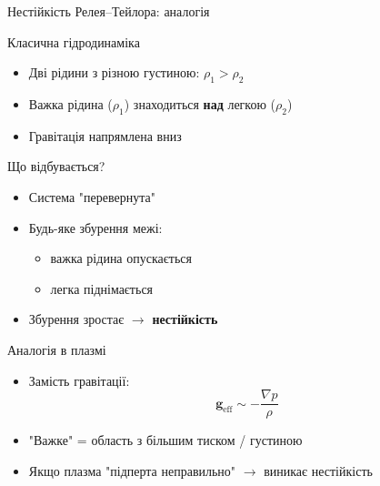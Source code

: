 \documentclass[]{beamer}
\begin{document}
\begin{frame}{Нестійкість Релея--Тейлора: аналогія}{}
	\begin{block}{Класична гідродинаміка}
		\begin{itemize}
			\item Дві рідини з різною густиною:
			      \(
			      \rho_1 > \rho_2
			      \)
			\item Важка рідина (\(\rho_1\)) знаходиться \textbf{над} легкою (\(\rho_2\))
			\item Гравітація напрямлена вниз
		\end{itemize}
	\end{block}

	\begin{block}{Що відбувається?}
		\begin{itemize}
			\item Система "перевернута"
			\item Будь-яке збурення межі:
			      \begin{itemize}
				      \item важка рідина опускається
				      \item легка піднімається
			      \end{itemize}
			\item Збурення зростає $\rightarrow$ \textbf{нестійкість}
		\end{itemize}
	\end{block}

	\begin{block}{Аналогія в плазмі}
		\begin{itemize}
			\item Замість гравітації:
			      \[
				      \mathbf{g}_{\text{eff}} \sim -\frac{\nabla p}{\rho}
			      \]
			\item "Важке" = область з більшим тиском / густиною
			\item Якщо плазма "підперта неправильно" $\rightarrow$ виникає нестійкість
		\end{itemize}
	\end{block}
\end{frame}
\end{document}
